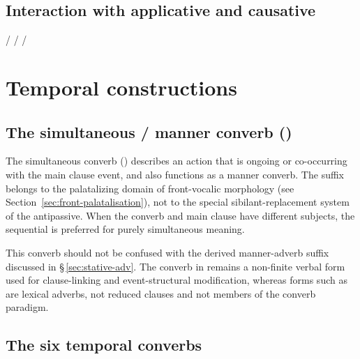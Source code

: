 \subsection{Interaction with applicative and causative}

\pex
\a {} /  
\a {} /  
\a {} /  
\xe

\section{Temporal constructions}\label{sec:temporal}

\subsection{The simultaneous / manner converb ()}

The simultaneous converb () describes an action that is ongoing or co-occurring with the main clause event, and also functions as a manner converb. The suffix belongs to the palatalizing domain of front-vocalic morphology (see Section~\ref{sec:front-palatalisation}), not to the special sibilant-replacement system of the antipassive. When the converb and main clause have different subjects, the sequential  is preferred for purely simultaneous meaning.

This converb should not be confused with the derived manner-adverb suffix
 discussed in §\,\ref{sec:stative-adv}. The converb in 
remains a non-finite verbal form used for clause-linking and event-structural
modification, whereas forms such as   are lexical
adverbs, not reduced clauses and not members of the converb paradigm.

\subsection{The six temporal converbs}

